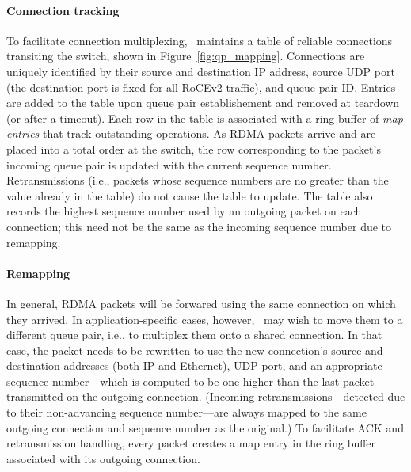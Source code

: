 \paragraph{Connection tracking}
%
To facilitate connection multiplexing, \sword\ maintains a table of
reliable connections transiting the switch, shown in
Figure~\ref{fig:qp_mapping}.  Connections are uniquely identified by
their source and destination IP address, source UDP port (the
destination port is fixed for all RoCEv2 traffic), and queue pair ID.
Entries are added to the table upon queue pair establishement and
removed at teardown (or after a timeout).  Each row in the table is
associated with a ring buffer of \emph{map entries} that track
outstanding operations.  As RDMA packets arrive and are placed into a
total order at the switch, the row corresponding to the packet's
incoming queue pair is updated with the current sequence number.
Retransmissions (i.e., packets whose sequence numbers are no greater
than the value already in the table) do not cause the table to update.
The table also records the highest sequence number used by an outgoing
packet on each connection; this need not be the same as the incoming
sequence number due to remapping.

\paragraph{Remapping}
\label{ss:remapping}
In general, RDMA packets will be forwared using the same connection on
which they arrived.  In application-specific cases, however,
\sword\ may wish to move them to a different queue pair, i.e., to
multiplex them onto a shared connection.  In that case, the packet
needs to be rewritten to use the new connection's source and
destination addresses (both IP and Ethernet), UDP port, and an
appropriate sequence number---which is computed to be one higher than
the last packet transmitted on the outgoing connection.  (Incoming
retransmissions---detected due to their non-advancing sequence
number---are always mapped to the same outgoing connection and
sequence number as the original.)  To facilitate ACK and
retransmission handling, every packet creates a map entry in
the ring buffer associated with its outgoing connection.

